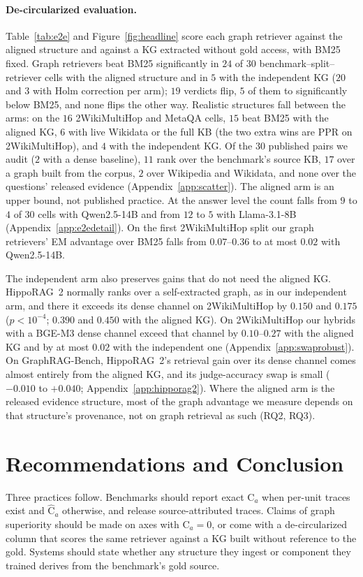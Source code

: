 \documentclass[11pt]{article}
\newcommand{\C}{\mathrm{C}}
\newcommand{\Chat}{\widehat{\mathrm{C}}}
\begin{document}
\paragraph{De-circularized evaluation.} Table~\ref{tab:e2e} and Figure~\ref{fig:headline} score each graph retriever against the aligned structure and against a KG extracted without gold access, with BM25 fixed. Graph retrievers beat BM25 significantly in $24$ of $30$ benchmark--split--retriever cells with the aligned structure and in $5$ with the independent KG ($20$ and $3$ with Holm correction per arm); $19$ verdicts flip, $5$ of them to significantly below BM25, and none flips the other way. Realistic structures fall between the arms: on the $16$ 2WikiMultiHop and MetaQA cells, $15$ beat BM25 with the aligned KG, $6$ with live Wikidata or the full KB (the two extra wins are PPR on 2WikiMultiHop), and $4$ with the independent KG. Of the $30$ published pairs we audit ($2$ with a dense baseline), $11$ rank over the benchmark's source KB, $17$ over a graph built from the corpus, $2$ over Wikipedia and Wikidata, and none over the questions' released evidence (Appendix~\ref{app:scatter}). The aligned arm is an upper bound, not published practice. At the answer level the count falls from $9$ to $4$ of $30$ cells with Qwen2.5-14B and from $12$ to $5$ with Llama-3.1-8B (Appendix~\ref{app:e2edetail}). On the first 2WikiMultiHop split our graph retrievers' EM advantage over BM25 falls from $0.07$--$0.36$ to at most $0.02$ with Qwen2.5-14B.

The independent arm also preserves gains that do not need the aligned KG. HippoRAG~2 normally ranks over a self-extracted graph, as in our independent arm, and there it exceeds its dense channel on 2WikiMultiHop by $0.150$ and $0.175$ ($p<10^{-4}$; $0.390$ and $0.450$ with the aligned KG). On 2WikiMultiHop our hybrids with a BGE-M3 dense channel exceed that channel by $0.10$--$0.27$ with the aligned KG and by at most $0.02$ with the independent one (Appendix~\ref{app:swaprobust}). On GraphRAG-Bench, HippoRAG~2's retrieval gain over its dense channel comes almost entirely from the aligned KG, and its judge-accuracy swap is small ($-0.010$ to $+0.040$; Appendix~\ref{app:hipporag2}). Where the aligned arm is the released evidence structure, most of the graph advantage we measure depends on that structure's provenance, not on graph retrieval as such (RQ2, RQ3).

\section{Recommendations and Conclusion}
\label{sec:recommend}
Three practices follow. Benchmarks should report exact $\C_a$ when per-unit traces exist and $\Chat_a$ otherwise, and release source-attributed traces. Claims of graph superiority should be made on axes with $\C_a=0$, or come with a de-circularized column that scores the same retriever against a KG built without reference to the gold. Systems should state whether any structure they ingest or component they trained derives from the benchmark's gold source.
\end{document}
